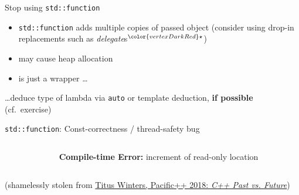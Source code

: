 \begin{frame}[fragile]{Stop using \texttt{std::function}}

    \begin{itemize}
        \item \texttt{std::function} adds multiple copies of passed object (consider using drop-in replacements such as \textit{delegate}s${}^{\color{vertexDarkRed}\star}$)
        \item may cause heap allocation
        \item is just a wrapper \ldots
    \end{itemize}
    \ldots deduce type of lambda via \texttt{auto} or template deduction, \textbf{if possible} (cf.\ exercise)

    \vspace{5mm}

\end{frame}

\begin{frame}[fragile]{\texttt{std::function}: Const-correctness / thread-safety bug}
    \begin{columns}[T]
        \begin{column}{.45\textwidth}
        \end{column}
        \begin{column}{.45\textwidth}
            \textbf{Compile-time Error:} increment of read-only location
        \end{column}
    \end{columns} 

    \begin{center}
        (\footnotesize shamelessly stolen from \href{https://youtu.be/IY8tHh2LSX4}{Titus Winters, Pacific++ 2018: \textit{C++ Past vs. Future}})
    \end{center}
\end{frame}
